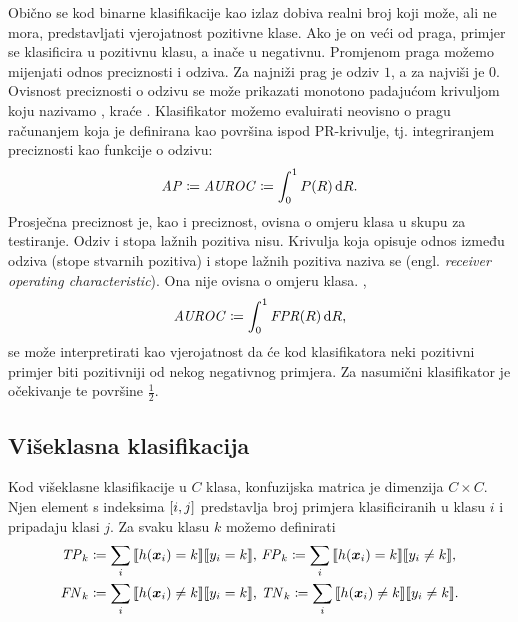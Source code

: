 \documentclass[utf8, diplomski, lmodern]{fer}
\begin{document}
Obično se kod binarne klasifikacije kao izlaz dobiva realni broj koji može, ali ne mora, predstavljati vjerojatnost pozitivne klase. Ako je on veći od praga, primjer se klasificira u pozitivnu klasu, a inače u negativnu. Promjenom praga možemo mijenjati odnos preciznosti i odziva. Za najniži prag je odziv $1$, a za najviši je $0$. Ovisnost preciznosti o odzivu se može prikazati monotono padajućom krivuljom koju nazivamo , kraće . Klasifikator možemo evaluirati neovisno o pragu računanjem  koja je definirana kao površina ispod PR-krivulje, tj. integriranjem preciznosti kao funkcije o odzivu:
\begin{align}
\mathit{AP} \coloneqq \mathit{AUROC} \coloneqq \int_0^1 P(R)\mathop{}\!\mathrm{d} R \text{.}
\end{align}
Prosječna preciznost je, kao i preciznost, ovisna o omjeru klasa u skupu za testiranje. Odziv i stopa lažnih pozitiva nisu. Krivulja koja opisuje odnos između odziva (stope stvarnih pozitiva) i stope lažnih pozitiva naziva se  (engl. \textit{receiver operating characteristic}). Ona nije ovisna o omjeru klasa. ,
\begin{align}
\mathit{AUROC} \coloneqq \int_0^1 \mathit{FPR}(R)\mathop{}\!\mathrm{d} R \text{,}
\end{align}
se može interpretirati kao vjerojatnost da će kod klasifikatora neki pozitivni primjer  biti pozitivniji od nekog negativnog primjera. Za nasumični klasifikator je očekivanje te površine $\frac{1}{2}$.

\subsection{Višeklasna klasifikacija}

Kod višeklasne klasifikacije u $C$ klasa, konfuzijska matrica je dimenzija $C\times C$. Njen element s indeksima $\sbr{i,j}$ predstavlja broj primjera klasificiranih u klasu $i$ i pripadaju klasi $j$. Za svaku klasu $k$ možemo definirati
\begin{align}
\begin{aligned}
\TP_k&\coloneqq\sum_i\enbbracket{h(\vec x_i)=k}\enbbracket{y_i=k} \text{, }
\FP_k\coloneqq\sum_i\enbbracket{h(\vec x_i)=k}\enbbracket{y_i\neq k} \text{,} \\
\FN_k&\coloneqq\sum_i\enbbracket{h(\vec x_i)\neq k}\enbbracket{y_i=k} \text{, }
\TN_k\coloneqq\sum_i\enbbracket{h(\vec x_i)\neq k}\enbbracket{y_i\neq k} \text{.}
\end{aligned}
\end{align}
\end{document}
